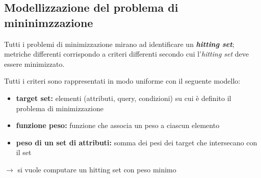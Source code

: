 \documentclass{report}
\begin{document}
\subsection{Modellizzazione del problema di mininimzzazione}
Tutti i problemi di minimizzazione mirano ad identificare 
un \textit{\textbf{hitting set}}; metriche differenti corrispondo a criteri 
differenti secondo cui l'\textit{hitting set} deve essere minimizzato.

\noindent Tutti i criteri sono rappresentati in modo uniforme 
con il seguente modello:
\begin{itemize}
    \item \textbf{target set:} elementi (attributi, query, condizioni) su cui è definito il problema di minimizzazione
    \item \textbf{funzione peso:} funzione che associa un peso a ciascun elemento
    \item \textbf{peso di un set di attributi:} somma dei pesi dei target che intersecano con il set
\end{itemize}

$\rightarrow$ si vuole computare un hitting set con peso minimo
\end{document}
